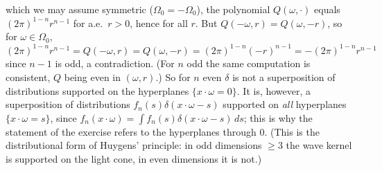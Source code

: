 which we may assume symmetric ($\Omega_0=-\Omega_0$), the polynomial $Q(\omega,\cdot)$ equals $(2\pi)^{1-n}r^{n-1}$
for a.e.\ $r>0$, hence for all $r$. But $Q(-\omega,r)=Q(\omega,-r)$, so for $\omega\in\Omega_0$,
$(2\pi)^{1-n}r^{n-1}=Q(-\omega,r)=Q(\omega,-r)=(2\pi)^{1-n}(-r)^{n-1}=-(2\pi)^{1-n}r^{n-1}$ since $n-1$ is odd,
a contradiction. (For $n$ odd the same computation is consistent, $Q$ being even in $(\omega,r)$.) So for $n$
even $\delta$ is not a superposition of distributions supported on the hyperplanes $\{x\cdot\omega=0\}$. It is,
however, a superposition of distributions $f_n(s)\delta(x\cdot\omega-s)$ supported on \emph{all} hyperplanes
$\{x\cdot\omega=s\}$, since $f_n(x\cdot\omega)=\int f_n(s)\delta(x\cdot\omega-s)\,ds$; this is why the statement of the
exercise refers to the hyperplanes through $0$. (This is the distributional form of Huygens' principle: in
odd dimensions $\ge3$ the wave kernel is supported on the light cone, in even dimensions it is not.)
